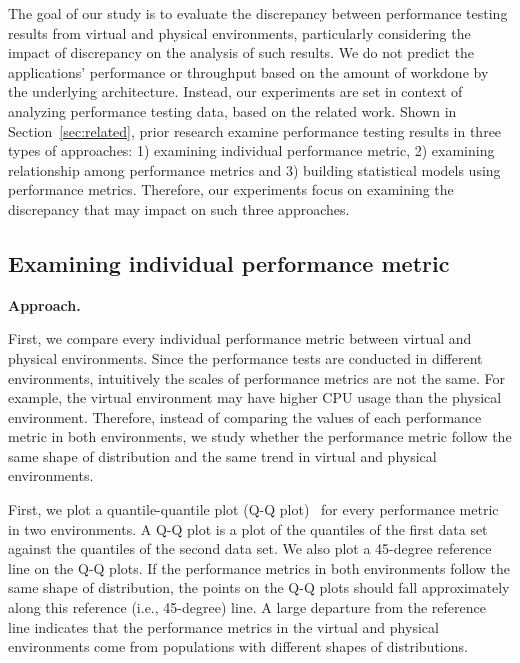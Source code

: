 
The goal of our study is to evaluate the discrepancy between performance testing results from virtual and physical environments, particularly considering the impact of discrepancy on the analysis of such results. We do not predict the applications' performance or throughput based on the amount of workdone by the underlying architecture. Instead, our experiments are set in context of analyzing performance testing data, based on the related work. Shown in Section~\ref{sec:related}, prior research examine performance testing results in three types of approaches: 1) examining individual performance metric, 2) examining relationship among performance metrics and 3) building statistical models using performance metrics. Therefore, our experiments focus on examining the discrepancy that may impact on such three approaches.



\subsection{Examining individual performance metric}
\label{sec:individual}
\noindent \textbf{Approach.} 

First, we compare every individual performance metric between virtual and physical environments. Since the performance tests are conducted in different environments, intuitively the scales of performance metrics are not the same. For example, the virtual environment may have higher CPU usage than the physical environment. Therefore, instead of comparing the values of each performance metric in both environments, we study whether the performance metric follow the same shape of distribution and the same trend in virtual and physical environments. 

First, we plot a quantile-quantile plot (Q-Q plot)~\cite{qqplots} for every performance metric in two environments. A Q-Q plot is a plot of the quantiles of the first data set against the quantiles of the second data set. We also plot a 45-degree reference line on the Q-Q plots. If the performance metrics in both environments follow the same shape of distribution, the points on the Q-Q plots should fall approximately along this reference (i.e., 45-degree) line. A large departure from the reference line indicates that the performance metrics in the virtual and physical environments come from populations with different shapes of distributions. 

